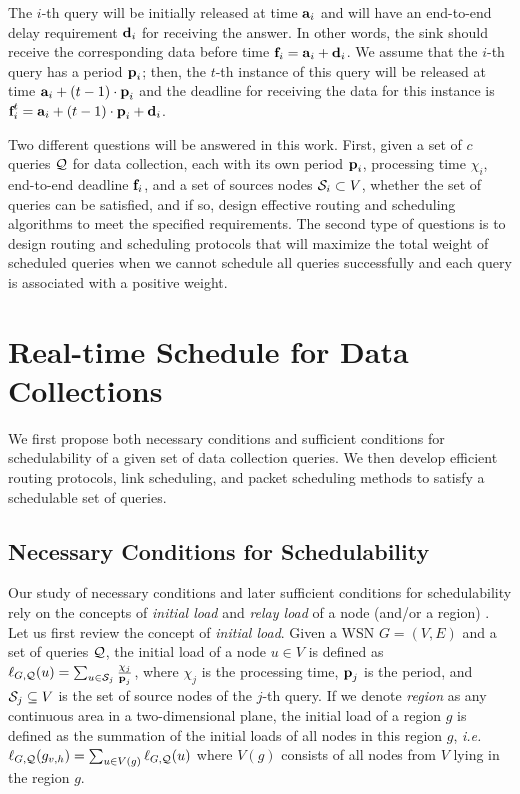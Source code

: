\documentclass[conference,10pt]{IEEEtran}\usepackage{amsmath}
\def\sources{{\cal S}}
\def\processing{{\chi}}
\def\queryset{{\cal Q}}
\def\period{{\textbf p}}
\def\delay{{\textbf d}}
\def\deadline{{\textbf f}}
\def\release{{\textbf a}}
\def\initiaload{{\ell}}
\def\ie{\textit{i.e.}\xspace}
\def\qnum{{c}}
\begin{document}
The $i$-th query  will be initially released at time
 $\release_i$ and will have an end-to-end delay
 requirement  $\delay_i$ for receiving the answer.
In other words, the sink should receive the corresponding data before time
 $\deadline_i=\release_i + \delay_i$.
We  assume that the $i$-th query has a period $\period_i$;
 then, the $t$-th instance of this query   will be released
 at time $\release_i + (t-1) \cdot \period_i$ and the deadline for receiving
 the data for this instance is $\deadline_i^t=\release_i + (t-1) \cdot \period_i + \delay_i$.

Two different questions will be answered in this work. First, given
a set of $\qnum$ queries $\queryset$ for data collection,
 each with its own period $\period_i$,
processing time  $\processing_i$,  end-to-end deadline
$\deadline_i$, and a set of sources nodes $\sources_i \subset V$,
 whether the set of queries can be satisfied, and if so, design
 effective routing and scheduling algorithms to meet the specified requirements.
The second type of questions is to
design routing and scheduling
 protocols that will maximize the total weight of scheduled queries
 when we cannot schedule all queries successfully and each query is
 associated with a positive weight.




\section{Real-time Schedule for Data Collections}
\label{sec:col}

We first propose both necessary conditions and
 sufficient conditions for schedulability of a given set of data collection queries.
We then develop efficient  routing protocols, link scheduling, and
packet
 scheduling methods to satisfy a schedulable set of queries.

\subsection{Necessary Conditions for Schedulability}
Our study of necessary conditions and later sufficient conditions
 for schedulability rely on
 the concepts of \emph{initial load} and \emph{relay
 load} of a node (and/or a region) \cite{xu2012efficient}.
Let us first review the concept of \emph{initial load}. Given a
WSN  $G=(V,E)$ and a set of queries $\queryset$, the initial load of
a node
 $u\in V$ is defined as
 $\initiaload_{G,  \queryset}(u) = \sum_{u\in \sources_j} \frac{ \processing_j}{\period_j}$,
where $\processing_j$ is the processing time, $\period_j$ is the
 period, and $\sources_j\subseteq V$
 is the set of source nodes of the $j$-th query.
If we denote \emph{region} as any continuous area in a
two-dimensional plane, the initial load of a region $g$ is defined
as the summation of the
 initial loads of
 all nodes in this region $g$, \ie
 $\initiaload_{G,  \queryset}(g_{v,h})=\sum_{u\in V(g)}
 \initiaload_{G,  \queryset}(u)$ where
$V(g)$ consists of all nodes from $V$ lying in the region $g$.
\end{document}
